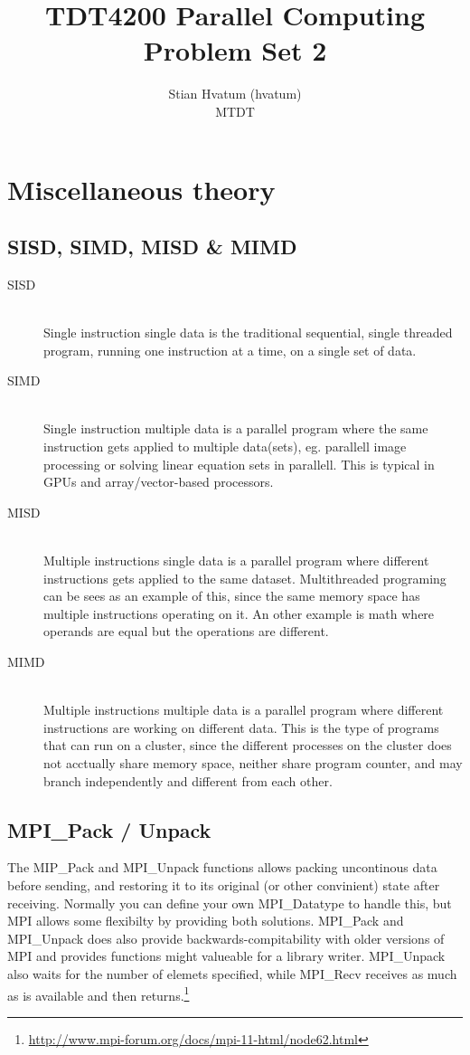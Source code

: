 \documentclass[english,a4paper,numbers=noenddot]{scrartcl}
\title{TDT4200 Parallel Computing\\
\Huge Problem Set 2}
\author{Stian Hvatum (hvatum)\\MTDT}
\begin{document}
\maketitle
\tableofcontents
\newpage
\section{Miscellaneous theory}
\subsection{SISD, SIMD, MISD \& MIMD}
\begin{description}
    \item[SISD] \hfill \\
	Single instruction single data is the traditional sequential, single threaded program, running one instruction at a time, on a single set of data.
    \item[SIMD] \hfill \\
	Single instruction multiple data is a parallel program where the same instruction gets applied to multiple data(sets), eg. parallell image processing or solving linear equation sets in parallell. This is typical in GPUs and array/vector-based processors.
    \item[MISD] \hfill \\
	Multiple instructions single data is a parallel program where different instructions gets applied to the same dataset. Multithreaded programing can be sees as an example of this, since the same memory space has multiple instructions operating on it. An other example is math where operands are equal but the operations are different.
    \item[MIMD] \hfill \\
	Multiple instructions multiple data is a parallel program where different instructions are working on different data. This is the type of programs that can run on a cluster, since the different processes on the cluster does not acctually share memory space, neither share program counter, and may branch independently and different from each other.
\end{description}

\subsection{MPI\_Pack / Unpack}
The MIP\_Pack and MPI\_Unpack functions allows packing uncontinous data before sending, and restoring it to its original (or other convinient) state after receiving. Normally you can define your own MPI\_Datatype to handle this, but MPI allows some flexibilty by providing both solutions. MPI\_Pack and MPI\_Unpack does also provide backwards-compitability with older versions of MPI and provides functions might valueable for a library writer. MPI\_Unpack also waits for the number of elemets specified, while MPI\_Recv receives as much as is available and then returns.\footnote{\url{http://www.mpi-forum.org/docs/mpi-11-html/node62.html}}
\newpage
\end{document}
